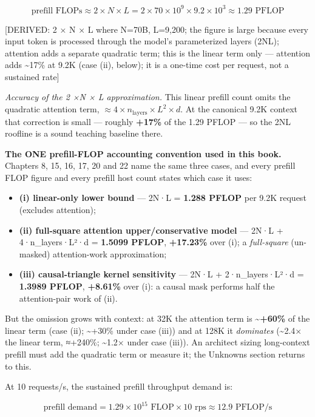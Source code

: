 \[
\text{prefill FLOPs} \approx 2 \times N \times L = 2 \times 70 \times 10^9 \times 9.2 \times 10^3 \approx 1.29 \text{ PFLOP}
\]

{[}DERIVED: 2 × N × L where N=70B, L=9,200; the figure is large because
every input token is processed through the model's parameterized layers
(2NL); attention adds a separate quadratic term; this is the linear term
only --- attention adds \textasciitilde17\% at 9.2K (case (ii), below);
it is a one-time cost per request, not a sustained rate{]}

\emph{Accuracy of the 2 ×N × L approximation.} This linear prefill count
omits the quadratic attention term,
\(\approx 4 \times n_\text{layers} \times L^2 \times d\). At the
canonical 9.2K context that correction is small --- roughly
\textbf{+17\%} of the 1.29 PFLOP --- so the 2NL roofline is a sound
teaching baseline there.

\textbf{The ONE prefill-FLOP accounting convention used in this book.}
Chapters 8, 15, 16, 17, 20 and 22 name the same three cases, and every
prefill FLOP figure and every prefill host count states which case it
uses:

\begin{itemize}
\tightlist
\item
  \textbf{(i) linear-only lower bound} --- 2N·L = \textbf{1.288 PFLOP}
  per 9.2K request (excludes attention);
\item
  \textbf{(ii) full-square attention upper/conservative model} --- 2N·L
  + 4·n\_layers·L²·d = \textbf{1.5099 PFLOP}, \textbf{+17.23\%} over
  (i); a \emph{full-square} (un-masked) attention-work approximation;
\item
  \textbf{(iii) causal-triangle kernel sensitivity} --- 2N·L +
  2·n\_layers·L²·d = \textbf{1.3989 PFLOP}, \textbf{+8.61\%} over (i): a
  causal mask performs half the attention-pair work of (ii).
\end{itemize}

But the omission grows with context: at 32K the attention term is
\textasciitilde{}\textbf{+60\%} of the linear term (case (ii);
\textasciitilde+30\% under case (iii)) and at 128K it \emph{dominates}
(\textasciitilde2.4× the linear term, ≈+240\%; \textasciitilde1.2× under
case (iii)). An architect sizing long-context prefill must add the
quadratic term or measure it; the Unknowns section returns to this.

At 10 requests/s, the sustained prefill throughput demand is:

\[
\text{prefill demand} = 1.29 \times 10^{15} \text{ FLOP} \times 10 \text{ rps} \approx 12.9 \text{ PFLOP/s}
\]

